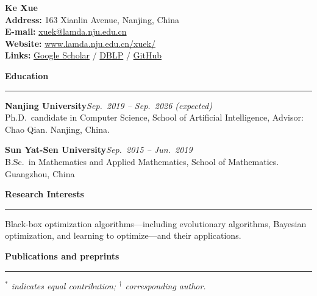 \documentclass[11pt,a4paper]{article}
\newcommand{\cvname}[1]{{\Large\bfseries #1}}
\newcommand{\cvsection}[1]{%
  \vspace{0.65em}%
  \noindent\textbf{\large #1}\\[-0.15em]
  \rule{\textwidth}{0.4pt}%
  \vspace{0.4em}%
}
\newcommand{\cventry}[3]{%
  \noindent\textbf{#1}\hfill\textit{#2}\\[-0.05em]
  #3\par
}
\begin{document}
\pagestyle{empty}

\noindent
{\cvname{Ke Xue}}\\[0.4em]
\textbf{Address:} 163 Xianlin Avenue, Nanjing, China\\
\textbf{E-mail:} \href{mailto:xuek@lamda.nju.edu.cn}{xuek@lamda.nju.edu.cn}\\
\textbf{Website:} \href{https://www.lamda.nju.edu.cn/xuek/}{www.lamda.nju.edu.cn/xuek/}\\
\textbf{Links:}
\href{https://scholar.google.com/citations?user=78bZVOwAAAAJ}{Google Scholar} /
\href{https://dblp.org/pid/93/2469-1.html}{DBLP} /
\href{https://github.com/KeXue-NJU}{GitHub}

\cvsection{Education}
\cventry{Nanjing University}{Sep.\ 2019 -- Sep.\ 2026 (expected)}{%
  Ph.D.\ candidate in Computer Science, School of Artificial Intelligence, Advisor: Chao Qian. Nanjing, China.}
\cventry{Sun Yat-Sen University}{Sep.\ 2015 -- Jun.\ 2019}{%
  B.Sc.\ in Mathematics and Applied Mathematics, School of Mathematics. Guangzhou, China}

\cvsection{Research Interests}
Black-box optimization algorithms---including evolutionary algorithms, Bayesian optimization, and learning to optimize---and their applications.

\cvsection{Publications and preprints}

\textit{$^*$ indicates equal contribution; $^\dagger$ corresponding author.}
\end{document}
